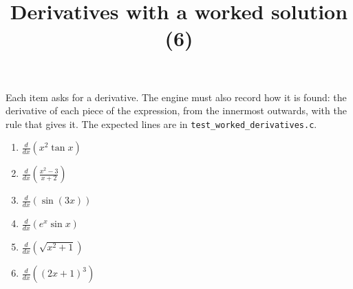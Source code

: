 \documentclass[11pt,a4paper]{article}
\title{Derivatives with a worked solution (6)}
\author{}
\date{}
\begin{document}
\maketitle
Each item asks for a derivative. The engine must also record how it is found: the derivative of each piece of the expression, from the innermost outwards, with the rule that gives it. The expected lines are in \texttt{test\_worked\_derivatives.c}.

\begin{enumerate}
\item $\displaystyle \frac{d}{dx}\left( x^{2} \tan x \right)$
\item $\displaystyle \frac{d}{dx}\left( \frac{x^{2} - 3}{x + 2} \right)$
\item $\displaystyle \frac{d}{dx}\left( \sin(3x) \right)$
\item $\displaystyle \frac{d}{dx}\left( e^{x} \sin x \right)$
\item $\displaystyle \frac{d}{dx}\left( \sqrt{x^{2} + 1} \right)$
\item $\displaystyle \frac{d}{dx}\left( (2x + 1)^{3} \right)$
\end{enumerate}
\end{document}
